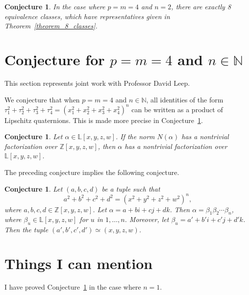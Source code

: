 \documentclass[12pt]{article}
\newtheorem{conjecture}[theorem]{Conjecture}
\theoremstyle{definition}
\theoremstyle{remark}
\newcommand{\Nnn}{\mathbb N}
\newcommand{\Zzz}{\mathbb Z}
\newcommand{\Lll}{\mathbb L}
\numberwithin{equation}{section}
\begin{document}
\begin{conjecture}
In the case where  \(p = m = 4\) and \(n = 2\),
there are exactly 8 equivalence classes, which have representatives
given in Theorem~\ref{theorem_8_classes}.
\end{conjecture}


\section{Conjecture for \(p = m = 4\) and \( n \in \Nnn \)}
This section represents joint work with Professor David Leep.

We conjecture that when \(p = m = 4\) and \( n \in \Nnn \),
all identities of the form
\(
\tau_1 ^ 2  + \tau_2 ^ 2  + \tau_3 ^ 2  + \tau_4 ^ 2  
= 
\left(  x_1 ^ 2 + x_2 ^ 2 + x_3 ^ 2 + x_4 ^ 2
\right) ^ n 
\)
can be written as
a product of Lipschitz quaternions.
This is made more precise in
Conjecture~\ref{conjecture_Ehrenborg-Leep}.

\begin{conjecture}
Let \( \alpha \in \Lll[x,y,z,w] \).
If the norm \( N(\alpha) \) has a nontrivial
factorization over \( \Zzz[x,y,z,w] \),
then \( \alpha \) has a nontrivial
factorization over \( \Lll[x,y,z,w] \).
\end{conjecture}
The preceding conjecture implies the following conjecture.
\begin{conjecture}
\label{conjecture_Ehrenborg-Leep}
Let \( (a, b, c, d) \) be a tuple such that
\[
a^2 + b^2 + c^2 + d^2 = (x^2 + y^2 + z^2 + w^2)^n,
\] 
where \( a, b, c, d \in \Zzz[x,y,z,w]\).
Let \(\alpha = a + bi + cj + dk \).
Then \( \alpha = \beta_1 \beta_2 \cdots \beta_n \),
where \( \beta_u \in \Lll[x,y,z,w] \) for \(u\) in \(1, \ldots, n\).
Moreover, let \( \beta_u = a' + b'i + c'j + d'k \). Then
the tuple \( (a', b', c', d') \simeq (x, y, z, w) \).
\end{conjecture}



\section{Things I can mention}
I have proved Conjecture~\ref{conjecture_Ehrenborg-Leep}
in the case where \(n = 1\).
\end{document}
